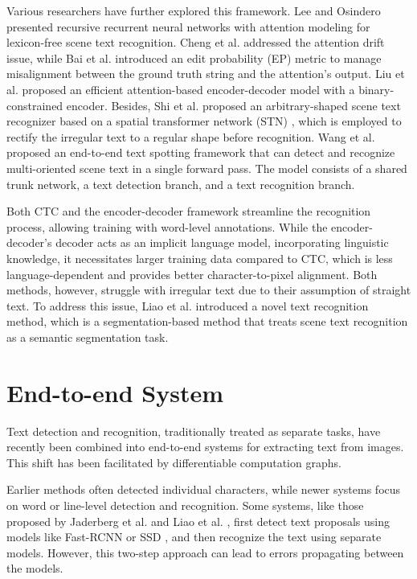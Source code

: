 \documentclass[12pt,twoside]{report}
\begin{document}
Various researchers have further explored this framework. Lee and Osindero \cite{lee2016recursive} presented recursive recurrent neural networks with attention modeling for lexicon-free scene text recognition. Cheng et al. \cite{cheng2017aspect} addressed the attention drift issue, while Bai et al. \cite{bai2018edit} introduced an edit probability (EP) metric to manage misalignment between the ground truth string and the attention's output. Liu et al. \cite{liu2018squeezedtext} proposed an efficient attention-based encoder-decoder model with a binary-constrained encoder. Besides, Shi et al. \cite{shi2018aster} proposed an arbitrary-shaped scene text recognizer based on a spatial transformer network (STN) \cite{bartz2017stn}, which is employed to rectify the irregular text to a regular shape before recognition. Wang et al. \cite{wang2020all} proposed an end-to-end text spotting framework that can detect and recognize multi-oriented scene text in a single forward pass. The model consists of a shared trunk network, a text detection branch, and a text recognition branch.

Both CTC and the encoder-decoder framework streamline the recognition process, allowing training with word-level annotations. While the encoder-decoder's decoder acts as an implicit language model, incorporating linguistic knowledge, it necessitates larger training data compared to CTC, which is less language-dependent and provides better character-to-pixel alignment. Both methods, however, struggle with irregular text due to their assumption of straight text. To address this issue, Liao et al. \cite{liao2019scene} introduced a novel text recognition method, which is a segmentation-based method that treats scene text recognition as a semantic segmentation task.

\section{End-to-end System}
Text detection and recognition, traditionally treated as separate tasks, have recently been combined into end-to-end systems for extracting text from images. This shift has been facilitated by differentiable computation graphs.

Earlier methods often detected individual characters, while newer systems focus on word or line-level detection and recognition. Some systems, like those proposed by Jaderberg et al. \cite{jaderberg2016reading} and Liao et al. \cite{liao2017textboxes}, first detect text proposals using models like Fast-RCNN \cite{girshick2015fastrcnn} or SSD \cite{liu2016ssd}, and then recognize the text using separate models. However, this two-step approach can lead to errors propagating between the models.
\end{document}
